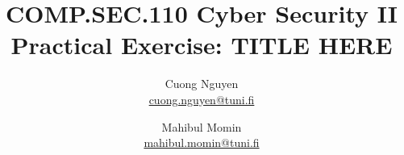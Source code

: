 \documentclass{article}
\title{COMP.SEC.110 Cyber Security II
    \large Practical Exercise: TITLE HERE\!
}
\author{Cuong Nguyen\\ \href{mailto:cuong.nguyen@tuni.fi}{cuong.nguyen@tuni.fi} 
        \and Mahibul Momin\\ \href{mailto:mahibul.momin@tuni.fi}{mahibul.momin@tuni.fi}
}
\begin{document}
    
\maketitle
\tableofcontents
\newpage

\listoffigures
\newpage

% 
% 








\printbibliography{}
\end{document}
